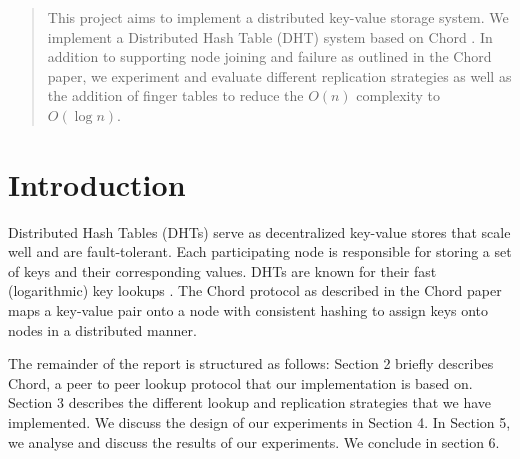 \documentclass{sig-alternate-10pt}
\begin{document}
\maketitle
\begin{abstract}
This project aims to implement a distributed key-value storage system. We implement a Distributed Hash Table (DHT) system based on Chord \cite{chord}. In addition to supporting node joining and failure as outlined in the Chord paper, we experiment and evaluate different replication strategies as well as the addition of finger tables to reduce the $O(n)$ complexity to $O(\log n)$.
\end{abstract}




\section{Introduction}
Distributed Hash Tables (DHTs) serve as decentralized key-value stores that scale well and are fault-tolerant. Each participating node is responsible for storing a set of keys and their corresponding values. DHTs are known for their fast (logarithmic) key lookups \cite{chord}. The Chord protocol as described in the Chord paper \cite{chord} maps a key-value pair onto a node with consistent hashing to assign keys onto nodes in a distributed manner.  

The remainder of the report is structured as follows: Section 2 briefly describes Chord, a peer to peer lookup protocol that our implementation is based on. Section 3 describes the different lookup and replication strategies that we have implemented. We discuss the design of our experiments in Section 4. In Section 5, we analyse and discuss the results of our experiments. We conclude in section 6.
\end{document}
